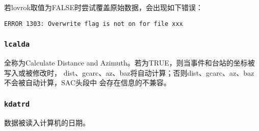 若lovrok取值为FALSE时尝试覆盖原始数据，会出现如下错误：
\begin{verbatim}
ERROR 1303: Overwrite flag is not on for file xxx
\end{verbatim}

\subsubsection{\texttt{lcalda}}
全称为Calculate Distance and Azimuth。若为TRUE，则当事件和台站的坐标被写入或被修改时，
dist、gcarc、az、baz将自动计算；否则dist、gcarc、az、baz不会被自动计算，SAC头段中
会存在信息的不兼容。

\subsubsection{\texttt{kdatrd}}
数据被读入计算机的日期。
